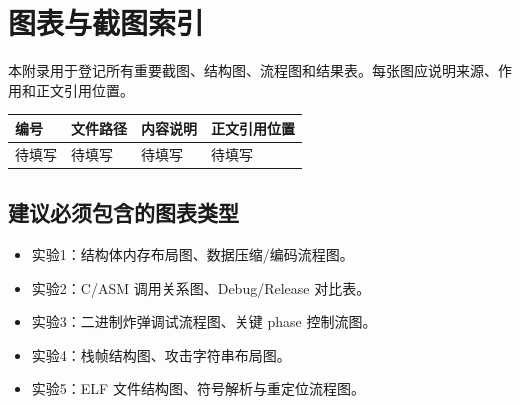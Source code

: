 \section{图表与截图索引}

本附录用于登记所有重要截图、结构图、流程图和结果表。每张图应说明来源、作用和正文引用位置。

\begin{longtable}{p{2cm}p{4.2cm}p{4.8cm}p{3cm}}
\toprule
编号 & 文件路径 & 内容说明 & 正文引用位置 \\
\midrule
待填写 & 待填写 & 待填写 & 待填写 \\
\bottomrule
\end{longtable}

\subsection{建议必须包含的图表类型}

\begin{itemize}
  \item 实验1：结构体内存布局图、数据压缩/编码流程图。
  \item 实验2：C/ASM 调用关系图、Debug/Release 对比表。
  \item 实验3：二进制炸弹调试流程图、关键 phase 控制流图。
  \item 实验4：栈帧结构图、攻击字符串布局图。
  \item 实验5：ELF 文件结构图、符号解析与重定位流程图。
\end{itemize}
